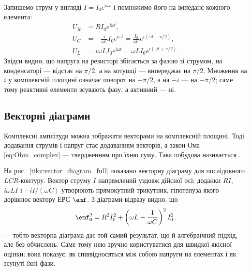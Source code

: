 Запишемо струм у вигляді $I = I_0 e^{i\omega t}$ і помножимо його на імпеданс кожного елемента:
\begin{align}
	U_R &= R I_0 e^{i\omega t}, \label{eq:UR_phase} \\[4pt]
	U_C &= -\frac{i}{\omega C} I_0 e^{i\omega t}
	      = \frac{I_0}{\omega C} e^{i(\omega t - \pi/2)}, \label{eq:UC_phase} \\[4pt]
	U_L &= i\omega L I_0 e^{i\omega t}
	      = \omega L I_0 e^{i(\omega t + \pi/2)}. \label{eq:UL_phase}
\end{align}
Звідси видно, що напруга на резисторі збігається за фазою зі струмом, на конденсаторі --- відстає на $\pi/2$, а на котушці --- випереджає на $\pi/2$. Множення на $i$ у комплексній площині означає поворот на $+\pi/2$, а на $-i$ --- на $-\pi/2$; саме тому реактивні елементи зсувають фазу, а активний --- ні.

\subsection*{Векторні діаграми}

Комплексні амплітуди можна зображати векторами на комплексній площині. Тоді додавання струмів і напруг стає додаванням векторів, а закон Ома \eqref{eq:Ohm_complex} --- твердженням про їхню  суму. Така побудова називається .

На рис.~\ref{tikz:vector_diagram_full} показано векторну діаграму для послідовного $LCR$-контуру. Вектор струму $I$ напрямлений уздовж дійсної осі; доданки $RI$, $i\omega L I$ і $-iI/(\omega C)$ утворюють прямокутний трикутник, гіпотенуза якого дорівнює вектору ЕРС $\emf$. З діаграми відразу видно, що
\[
	\emf_0^2 = R^2 I_0^2 + \left(\omega L - \frac{1}{\omega C}\right)^2 I_0^2,
\]
--- тобто векторна діаграма дає той самий результат, що й алгебраїчний підхід, але без обчислень. Саме тому нею зручно користуватися для швидкої якісної оцінки: вона показує, як співвідносяться між собою напруги на елементах і як зсунуті їхні фази.

